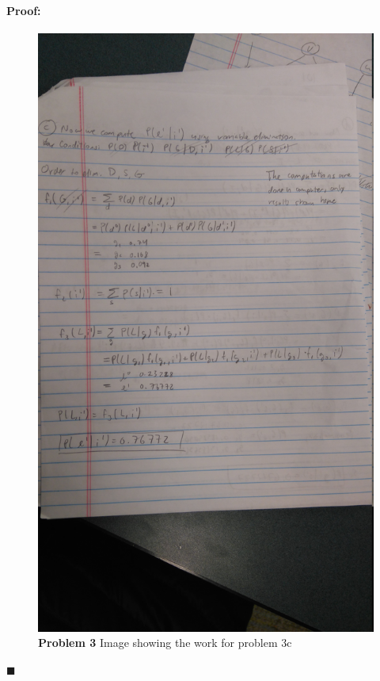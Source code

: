 \documentclass[12pt]{article}
\newenvironment{proof}{\paragraph{Proof: }}{\hfill$\blacksquare$}
\begin{document}
\begin{proof}
\newpage

\begin{figure}[!htbp]
\centering
\includegraphics[width = 13cm]{hw6_3c.jpg}
\caption{\textbf{Problem 3} Image showing the work for problem 3c}
\end{figure}


\newpage


\end{proof}
\end{document}
